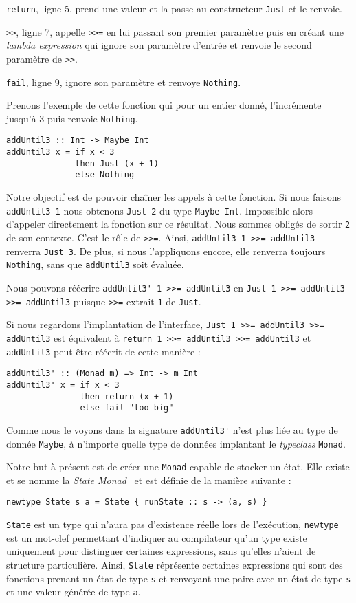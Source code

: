 \documentclass{llncs}
\begin{document}
\lstinline{return}, ligne 5, prend une valeur et la passe au constructeur
\lstinline{Just} et le renvoie.

\lstinline{>>}, ligne 7, appelle \lstinline{>>=} en lui passant son premier paramètre
puis en créant une \emph{lambda expression} qui ignore son paramètre d'entrée
et renvoie le second paramètre de \lstinline{>>}.

\lstinline{fail}, ligne 9, ignore son paramètre et renvoye \lstinline{Nothing}.

Prenons l'exemple de cette fonction qui pour un entier donné, l'incrémente jusqu'à
3 puis renvoie \lstinline{Nothing}.
\begin{lstlisting}
addUntil3 :: Int -> Maybe Int
addUntil3 x = if x < 3
              then Just (x + 1)
              else Nothing
\end{lstlisting}

Notre objectif est de pouvoir chaîner les appels à cette fonction.
Si nous faisons \lstinline{addUntil3 1} nous obtenons \lstinline{Just 2} du type \lstinline{Maybe Int}.
Impossible alors d'appeler directement la fonction sur ce résultat.
Nous sommes obligés de sortir \lstinline{2} de son contexte.
C'est le rôle de \lstinline{>>=}.
Ainsi, \lstinline{addUntil3 1 >>= addUntil3} renverra \lstinline{Just 3}.
De plus, si nous l'appliquons encore, elle renverra toujours \lstinline{Nothing},
sans que \lstinline{addUntil3} soit évaluée.

Nous pouvons réécrire \lstinline{addUntil3' 1 >>= addUntil3} en \lstinline{Just 1 >>= addUntil3 >>= addUntil3}
puisque \lstinline{>>=} extrait \lstinline{1} de \lstinline{Just}.

Si nous regardons l'implantation de l'interface, \lstinline{Just 1 >>= addUntil3 >>= addUntil3}
est équivalent à \lstinline{return 1 >>= addUntil3 >>= addUntil3} et \lstinline{addUntil3}
peut être réécrit de cette manière :
\begin{lstlisting}
addUntil3' :: (Monad m) => Int -> m Int
addUntil3' x = if x < 3
               then return (x + 1)
               else fail "too big"
\end{lstlisting}

Comme nous le voyons dans la signature \lstinline{addUntil3'} n'est plus liée au type
de donnée \lstinline{Maybe}, à n'importe quelle type de données implantant le \emph{typeclass}
\lstinline{Monad}.

Notre but à présent est de créer une \lstinline{Monad} capable de stocker un état.
Elle existe et se nomme la \emph{State Monad}~\cite{PeytonJones95} et est définie de la manière
suivante :
\begin{lstlisting}
newtype State s a = State { runState :: s -> (a, s) }
\end{lstlisting}
\lstinline{State} est un type qui n'aura pas d'existence réelle lors de l'exécution,
\lstinline{newtype} est un mot-clef permettant d'indiquer au compilateur qu'un type
existe uniquement pour distinguer certaines expressions, sans qu'elles n'aient de
structure particulière.
Ainsi, \lstinline{State} réprésente certaines expressions qui sont des fonctions
prenant un état de type \lstinline{s} et renvoyant une paire avec un état
de type \lstinline{s} et une valeur générée de type \lstinline{a}.
\end{document}

